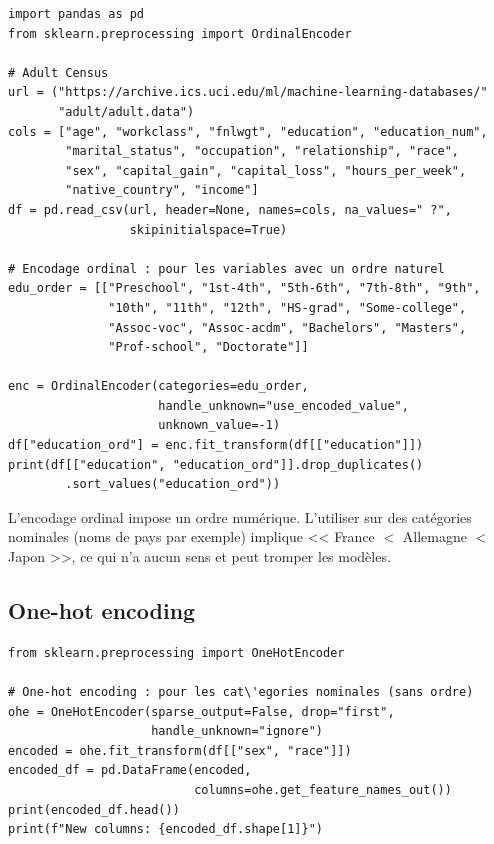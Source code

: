 \begin{verbatim}
import pandas as pd
from sklearn.preprocessing import OrdinalEncoder

# Adult Census
url = ("https://archive.ics.uci.edu/ml/machine-learning-databases/"
       "adult/adult.data")
cols = ["age", "workclass", "fnlwgt", "education", "education_num",
        "marital_status", "occupation", "relationship", "race",
        "sex", "capital_gain", "capital_loss", "hours_per_week",
        "native_country", "income"]
df = pd.read_csv(url, header=None, names=cols, na_values=" ?",
                 skipinitialspace=True)

# Encodage ordinal : pour les variables avec un ordre naturel
edu_order = [["Preschool", "1st-4th", "5th-6th", "7th-8th", "9th",
              "10th", "11th", "12th", "HS-grad", "Some-college",
              "Assoc-voc", "Assoc-acdm", "Bachelors", "Masters",
              "Prof-school", "Doctorate"]]

enc = OrdinalEncoder(categories=edu_order,
                     handle_unknown="use_encoded_value",
                     unknown_value=-1)
df["education_ord"] = enc.fit_transform(df[["education"]])
print(df[["education", "education_ord"]].drop_duplicates()
        .sort_values("education_ord"))
\end{verbatim}

\begin{warningbox}
L'encodage ordinal impose un ordre num\'erique. L'utiliser sur des cat\'egories nominales (noms de pays par exemple) implique << France $<$ Allemagne $<$ Japon >>, ce qui n'a aucun sens et peut tromper les mod\`eles.
\end{warningbox}

\subsection{One-hot encoding}

\begin{verbatim}
from sklearn.preprocessing import OneHotEncoder

# One-hot encoding : pour les cat\'egories nominales (sans ordre)
ohe = OneHotEncoder(sparse_output=False, drop="first",
                    handle_unknown="ignore")
encoded = ohe.fit_transform(df[["sex", "race"]])
encoded_df = pd.DataFrame(encoded,
                          columns=ohe.get_feature_names_out())
print(encoded_df.head())
print(f"New columns: {encoded_df.shape[1]}")
\end{verbatim}

